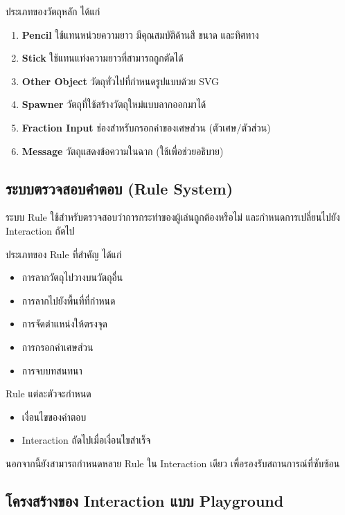 ประเภทของวัตถุหลัก ได้แก่

\begin{enumerate}
    \item \textbf{Pencil} ใช้แทนหน่วยความยาว มีคุณสมบัติด้านสี ขนาด และทิศทาง
    \item \textbf{Stick} ใช้แทนแท่งความยาวที่สามารถถูกตัดได้
    \item \textbf{Other Object} วัตถุทั่วไปที่กำหนดรูปแบบด้วย SVG
    \item \textbf{Spawner} วัตถุที่ใช้สร้างวัตถุใหม่แบบลากออกมาได้
    \item \textbf{Fraction Input} ช่องสำหรับกรอกค่าของเศษส่วน (ตัวเศษ/ตัวส่วน)
    \item \textbf{Message} วัตถุแสดงข้อความในฉาก (ใช้เพื่อช่วยอธิบาย)
\end{enumerate}

\subsection{ระบบตรวจสอบคำตอบ (Rule System)}

ระบบ Rule ใช้สำหรับตรวจสอบว่าการกระทำของผู้เล่นถูกต้องหรือไม่ และกำหนดการเปลี่ยนไปยัง Interaction ถัดไป

ประเภทของ Rule ที่สำคัญ ได้แก่

\begin{itemize}
    \item การลากวัตถุไปวางบนวัตถุอื่น
    \item การลากไปยังพื้นที่ที่กำหนด
    \item การจัดตำแหน่งให้ตรงจุด
    \item การกรอกค่าเศษส่วน
    \item การจบบทสนทนา
\end{itemize}

Rule แต่ละตัวจะกำหนด

\begin{itemize}
    \item เงื่อนไขของคำตอบ
    \item Interaction ถัดไปเมื่อเงื่อนไขสำเร็จ
\end{itemize}

นอกจากนี้ยังสามารถกำหนดหลาย Rule ใน Interaction เดียว เพื่อรองรับสถานการณ์ที่ซับซ้อน

\subsection{โครงสร้างของ Interaction แบบ Playground}


